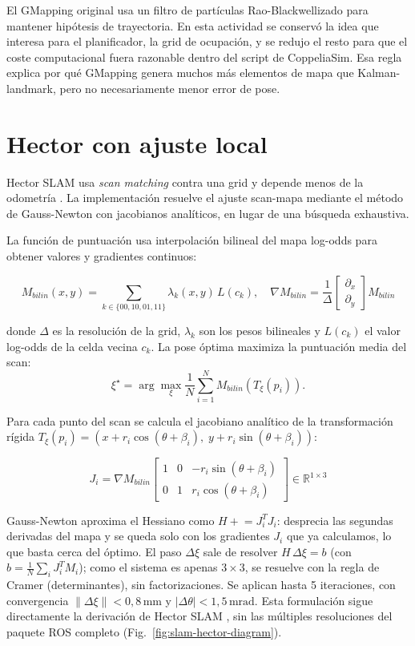El GMapping original usa un filtro de partículas Rao-Blackwellizado para
mantener hipótesis de trayectoria. En esta actividad se conservó la idea que
interesa para el planificador, la grid de ocupación, y se redujo el resto para
que el coste computacional fuera razonable dentro del script de CoppeliaSim. Esa
regla explica por qué GMapping genera muchos más elementos de mapa que
Kalman-landmark, pero no necesariamente menor error de pose.

\section{Hector con ajuste local}

Hector SLAM usa \textit{scan matching} contra una grid y depende menos de la
odometría \cite{kohlbrecher2011}. La implementación resuelve el ajuste
scan-mapa mediante el método de Gauss-Newton con jacobianos analíticos,
en lugar de una búsqueda exhaustiva.

La función de puntuación usa interpolación bilineal del mapa log-odds para
obtener valores y gradientes continuos:

\[
M_{bilin}(x,y)=\sum_{k\in\{00,10,01,11\}} \lambda_k(x,y)\,L(c_k),
\quad
\nabla M_{bilin}=\frac{1}{\Delta}\begin{bmatrix}\partial_x\\\partial_y\end{bmatrix}M_{bilin}
\]

donde \(\Delta\) es la resolución de la grid, \(\lambda_k\) son los pesos
bilineales y \(L(c_k)\) el valor log-odds de la celda vecina \(c_k\).
La pose óptima maximiza la puntuación media del scan:
\[
\xi^\star=\arg\max_\xi \frac{1}{N}\sum_{i=1}^{N}M_{bilin}\!\left(T_\xi(p_i)\right).
\]

Para cada punto del scan se calcula el jacobiano analítico de la
transformación rígida \(T_\xi(p_i)=(x+r_i\cos(\theta+\beta_i),\;y+r_i\sin(\theta+\beta_i))\):

\[
J_i=\nabla M_{bilin}\!\begin{bmatrix}1 & 0 & -r_i\sin(\theta+\beta_i)\\0 & 1 & r_i\cos(\theta+\beta_i)\end{bmatrix}
\in\mathbb{R}^{1\times3}
\]

Gauss-Newton aproxima el Hessiano como \(H\mathrel{+}=J_i^TJ_i\): desprecia las
segundas derivadas del mapa y se queda solo con los gradientes \(J_i\) que ya
calculamos, lo que basta cerca del óptimo. El paso \(\Delta\xi\) sale de resolver
\(H\,\Delta\xi=b\) (con \(b=\tfrac{1}{N}\sum_i J_i^TM_i\)); como el sistema es
apenas \(3\times3\), se resuelve con la regla de Cramer (determinantes), sin
factorizaciones. Se aplican hasta 5 iteraciones, con convergencia
\(\|\Delta\xi\|<0{,}8\,\text{mm}\) y \(|\Delta\theta|<1{,}5\,\text{mrad}\).
Esta formulación sigue directamente la derivación de Hector SLAM
\cite{kohlbrecher2011}, sin las múltiples resoluciones del paquete ROS completo
(Fig.~\ref{fig:slam-hector-diagram}).


